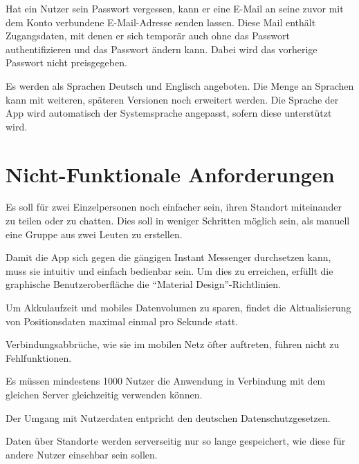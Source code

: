 \documentclass[parskip=full,11pt]{scrartcl}
\begin{document}
%
Hat ein Nutzer sein Passwort vergessen, kann er eine E-Mail an seine zuvor
mit dem Konto verbundene E-Mail-Adresse senden lassen.
Diese Mail enthält Zugangsdaten, mit denen er sich temporär auch ohne das
Passwort authentifizieren und das Passwort ändern kann.
Dabei wird das vorherige Passwort nicht preisgegeben.

Es werden als Sprachen Deutsch und Englisch angeboten.
Die Menge an Sprachen kann mit weiteren, späteren Versionen noch erweitert
werden.
Die Sprache der App wird automatisch der Systemsprache angepasst, sofern diese
unterstützt wird.

\pagebreak
\section{Nicht-Funktionale Anforderungen}

%
Es soll für zwei Einzelpersonen noch einfacher sein, ihren Standort miteinander
zu teilen oder zu chatten. Dies soll in weniger Schritten möglich sein, als
manuell eine Gruppe aus zwei Leuten zu erstellen.

Damit die App sich gegen die gängigen Instant Messenger durchsetzen kann, muss
sie intuitiv und einfach bedienbar sein. Um dies zu erreichen, erfüllt die
graphische Benutzeroberfläche die \enquote{Material Design}-Richtlinien.

Um Akkulaufzeit und mobiles Datenvolumen zu sparen, findet die Aktualisierung
von Positionsdaten maximal einmal pro Sekunde statt.

Verbindungsabbrüche, wie sie im mobilen Netz öfter auftreten, führen nicht zu
Fehlfunktionen.

Es müssen mindestens 1000 Nutzer die Anwendung in Verbindung mit dem gleichen
Server gleichzeitig verwenden können.

%
Der Umgang mit Nutzerdaten entpricht den deutschen Datenschutzgesetzen.

Daten über Standorte werden serverseitig nur so lange gespeichert, wie diese
für andere Nutzer einsehbar sein sollen.
\end{document}
